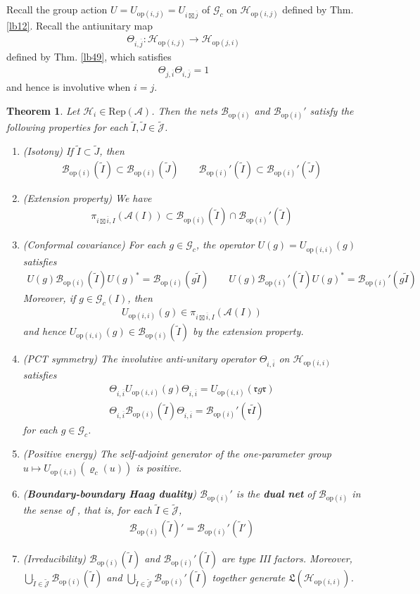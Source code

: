 \documentclass[11pt,b5paper,notitlepage]{article}
\theoremstyle{definition}
\theoremstyle{plain}
\newtheorem{thm}[df]{Theorem}
\newcommand{\fk}{\mathfrak}
\newcommand{\wtd}{\widetilde}
\newcommand{\ovl}{\overline}
\newcommand{\op}{\mathrm{op}}
\newcommand{\Jtd}{\widetilde{\mathcal J}}
\newcommand{\RepA}{\mathrm{Rep}(\mathcal A)}
\newcommand{\Gc}{\mathscr G_c}
\newcommand{\rk}{\mathfrak r}
\newcommand{\MA}{\mathcal A}
\newcommand{\MH}{\mathcal H}
\newcommand{\Bopi}{\mathcal B_{\mathrm{op}(i)}}
\newcommand{\Hopij}{\mathcal H_{\mathrm{op}(i,j)}}
\newcommand{\Hopji}{\mathcal H_{\mathrm{op}(j,i)}}
\newcommand{\Hopii}{\mathcal H_{\mathrm{op}(i,i)}}
\newcommand{\opii}{\mathrm{op}(i,i)}
\numberwithin{equation}{section}
\begin{document}
Recall the group action $U=U_{\op(i,j)}=U_{i\boxtimes\ovl j}$ of $\Gc$ on $\Hopij$ defined by Thm. \ref{lb12}. Recall the antiunitary map
\begin{align*}
\Theta_{i,\ovl j}:\Hopij\rightarrow \Hopji
\end{align*}
defined by Thm. \ref{lb49}, which satisfies
\begin{align*}
\Theta_{j,\ovl i}\Theta_{i,\ovl j}=1
\end{align*}
and hence is involutive when $i=j$.

\begin{thm}\label{lb114}
Let $\MH_i\in\RepA$. Then the nets $\Bopi$ and $\Bopi'$ satisfy the following properties for each $\wtd I,\wtd J\in\Jtd$.
\begin{enumerate}[label=(\arabic*)]
\item (Isotony) If $\wtd I\subset\wtd J$, then 
\begin{align*}
\Bopi(\wtd I)\subset\Bopi(\wtd J)\qquad \Bopi'(\wtd I)\subset\Bopi'(\wtd J)
\end{align*}
\item (Extension property) We have
\begin{align*}
\pi_{i\boxtimes\ovl i,I}(\MA(I))\subset \Bopi(\wtd I)\cap\Bopi'(\wtd I)
\end{align*}
\item (Conformal covariance) For each $g\in\Gc$, the operator $U(g)=U_{\opii}(g)$ satisfies
\begin{align*}
U(g)\Bopi(\wtd I)U(g)^*=\Bopi(g\wtd I)\qquad U(g)\Bopi'(\wtd I)U(g)^*=\Bopi'(g\wtd I)
\end{align*}
Moreover, if $g\in\Gc(I)$, then 
\begin{align*}
U_{\opii}(g)\in\pi_{i\boxtimes\ovl i,I}(\MA(I))
\end{align*}
and hence $U_{\opii}(g)\in\Bopi(\wtd I)$ by the extension property.
\item (PCT symmetry) The involutive anti-unitary operator $\Theta_{i,\ovl i}$ on $\Hopii$ satisfies
\begin{gather*}
\Theta_{i,\ovl i}U_{\op(i,i)}(g)\Theta_{i,\ovl i}=U_{\op(i,i)}(\rk g\rk) \\
\Theta_{i,\ovl i}\Bopi(\wtd I)\Theta_{i,\ovl i}=\Bopi'(\rk\wtd I)
\end{gather*}
for each $g\in\Gc$.
\item (Positive energy) The self-adjoint generator of the one-parameter group $u\mapsto U_{\op(i,i)}(\varrho_c(u))$ is positive.
\item (\textbf{Boundary-boundary Haag duality}) $\Bopi'$ is the \textbf{dual net} of $\Bopi$ in the sense of \cite[Sec. 4]{Gui21b}, that is, for each $\wtd I\in\Jtd$, 
\begin{align*}
\Bopi(\wtd I)'=\Bopi'(\wtd I')
\end{align*}
\item (Irreducibility) $\Bopi(\wtd I)$ and $\Bopi'(\wtd I)$ are type III factors. Moreover, $\bigcup_{\wtd I\in\Jtd}\Bopi(\wtd I)$ and $\bigcup_{\wtd I\in\Jtd}\Bopi'(\wtd I)$ together generate $\fk L(\Hopii)$.
\end{enumerate}
\end{thm}
\end{document}
